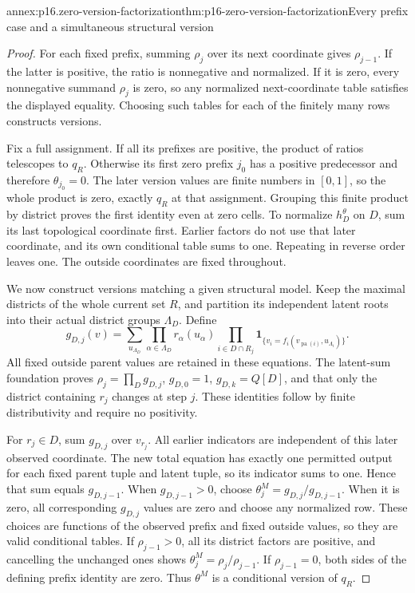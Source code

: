 \begin{annexitem}{annex:p16.zero-version-factorization}{thm:p16-zero-version-factorization}{Every prefix case and a simultaneous structural version}
\begin{proof}
For each fixed prefix, summing \(\rho_j\) over its next
coordinate gives \(\rho_{j-1}\). If the latter is positive,
the ratio is nonnegative and normalized. If it is zero, every
nonnegative summand \(\rho_j\) is zero, so any normalized
next-coordinate table satisfies the displayed equality. Choosing
such tables for each of the finitely many rows constructs versions.

Fix a full assignment. If all its prefixes are positive, the
product of ratios telescopes to \(q_R\). Otherwise its first
zero prefix \(j_0\) has a positive predecessor and therefore
\(\theta_{j_0}=0\). The later version values are finite
numbers in \([0,1]\), so the whole product is zero, exactly
\(q_R\) at that assignment. Grouping this finite product by
district proves the first identity even at zero cells. To normalize
\(h_D^\theta\) on \(D\), sum its last topological coordinate
first. Earlier factors do not use that later coordinate, and its
own conditional table sums to one. Repeating in reverse order
leaves one. The outside coordinates are fixed throughout.

We now construct versions matching a given structural model. Keep
the maximal districts of the whole current set \(R\), and
partition its independent latent roots into their actual district
groups \(\Lambda_D\). Define
\[
 g_{D,j}(v)=\sum_{u_{\Lambda_D}}
       \prod_{\alpha\in\Lambda_D}r_\alpha(u_\alpha)
       \prod_{i\in D\cap R_j}
       \mathbf1_{\{v_i=f_i(v_{\operatorname{pa}(i)},u_{\Lambda_i})\}}.
\]
All fixed outside parent values are retained in these equations.
The latent-sum foundation proves
\(\rho_j=\prod_D g_{D,j}\), \(g_{D,0}=1\),
\(g_{D,k}=Q[D]\), and that only the district containing
\(r_j\) changes at step \(j\). These identities follow
by finite distributivity and require no positivity.

For \(r_j\in D\), sum \(g_{D,j}\) over \(v_{r_j}\).
All earlier indicators are independent of this later observed
coordinate. The new total equation has exactly one permitted
output for each fixed parent tuple and latent tuple, so its
indicator sums to one. Hence that sum equals \(g_{D,j-1}\).
When \(g_{D,j-1}>0\), choose
\(\theta^M_j=g_{D,j}/g_{D,j-1}\). When it is zero,
all corresponding \(g_{D,j}\) values are zero and choose any
normalized row. These choices are functions of the observed prefix
and fixed outside values, so they are valid conditional tables.
If \(\rho_{j-1}>0\), all its district factors are positive,
and cancelling the unchanged ones shows
\(\theta^M_j=\rho_j/\rho_{j-1}\). If \(\rho_{j-1}=0\),
both sides of the defining prefix identity are zero. Thus
\(\theta^M\) is a conditional version of \(q_R\).


\end{proof}
\end{annexitem}
